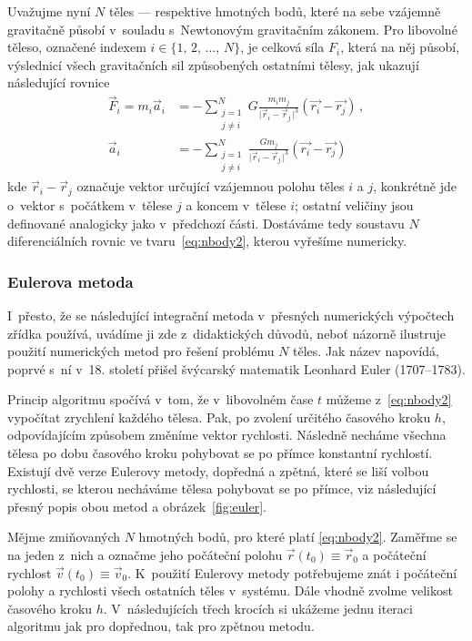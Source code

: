 \documentclass[A4paper, 12pt, oneside]{book}%
\newcommand{\abs}[1]{\lvert #1 \,\rvert}
\begin{document}
Uvažujme nyní $N$ těles --- respektive hmotných bodů, které na sebe vzájemně gravitačně působí v~souladu s~Newtonovým gravitačním zákonem. Pro libovolné těleso, označené indexem $i\in\{1,\,2,\,\dots,\,N\}$, je celková síla $F_i$, která na něj působí, výslednicí všech gravitačních sil způsobených ostatními tělesy, jak ukazují následující rovnice
\begin{align} 
	\vec{F}_i = m_i\vec{a}_i &= -\sum_{\substack{j=1 \\ j\neq i}}^N G\frac{m_im_j}{\abs{\vec{r}_i-\vec{r}_j}^3}(\vec{r_i}-\vec{r_j}) \label{eq:nbody1}\,, \\
		\vec{a}_i &= -\sum_{\substack{j=1 \\ j\neq i}}^N \frac{Gm_j}{\abs{\vec{r}_i-\vec{r}_j}^3}(\vec{r_i}-\vec{r_j}) \label{eq:nbody2}
\end{align}
kde $\vec{r}_i-\vec{r}_j$ označuje vektor určující vzájemnou polohu těles $i$ a $j$, konkrétně jde o~vektor s~počátkem v~tělese $j$ a koncem v~tělese $i$; ostatní veličiny jsou definované analogicky jako v~předchozí části. Dostáváme tedy soustavu $N$ diferenciálních rovnic ve tvaru~\eqref{eq:nbody2}, kterou vyřešíme numericky.
\subsubsection{Eulerova metoda}
I~přesto, že se následující integrační metoda v~přesných numerických výpočtech zřídka používá, uvádíme ji zde z~didaktických důvodů, neboť názorně ilustruje použití numerických metod pro řešení problému $N$ těles. Jak název napovídá, poprvé s~ní v~18. století přišel švýcarský matematik Leonhard Euler (1707--1783).

Princip algoritmu spočívá v~tom, že v~libovolném čase $t$ můžeme z~\eqref{eq:nbody2} vypočítat zrychlení každého tělesa. Pak, po zvolení určitého časového kroku $h$, odpovídajícím způsobem změníme vektor rychlosti. Následně necháme všechna tělesa po dobu časového kroku pohybovat se po přímce konstantní rychlostí. Existují dvě verze Eulerovy metody, dopředná a zpětná, které se liší volbou rychlosti, se kterou necháváme tělesa pohybovat se po přímce, viz následující přesný popis obou metod a obrázek~\ref{fig:euler}.

Mějme zmiňovaných $N$ hmotných bodů, pro které platí \eqref{eq:nbody2}. Zaměřme se na jeden z~nich a označme jeho počáteční polohu $\vec{r}(t_0)\equiv\vec{r}_0$ a počáteční rychlost $\vec{v}(t_0)\equiv\vec{v}_0$. K~použití Eulerovy metody potřebujeme znát i počáteční polohy a rychlosti všech ostatních těles v~systému. Dále vhodně zvolme velikost časového kroku $h$. V~následujících třech krocích si ukážeme jednu iteraci algoritmu jak pro dopřednou, tak pro zpětnou metodu.
\end{document}
